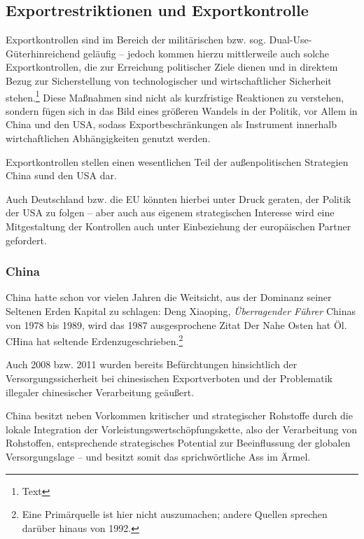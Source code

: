 \documentclass[12pt,a4paper,oneside]{book} %
\begin{document}
\subsection{Exportrestriktionen und Exportkontrolle}



Exportkontrollen sind im Bereich der militärischen bzw. sog. \glqq Dual-Use-Güter\grqq hinreichend geläufig -- jedoch kommen hierzu mittlerweile auch solche Exportkontrollen, die zur Erreichung politischer Ziele dienen und in direktem Bezug zur Sicherstellung von technologischer und wirtschaftlicher Sicherheit stehen.\footnote{Text} Diese Maßnahmen sind nicht als kurzfristige Reaktionen zu verstehen, sondern fügen sich in das Bild eines größeren Wandels in der Politik, vor Allem in China und den USA, sodass Exportbeschränkungen als Instrument innerhalb wirtchaftlichen Abhängigkeiten genutzt werden.

Exportkontrollen stellen einen wesentlichen Teil der außenpolitischen Strategien China sund den USA dar.

Auch Deutschland bzw. die EU könnten hierbei unter Druck geraten, der Politik der USA zu folgen -- aber auch aus eigenem strategischen Interesse wird eine Mitgestaltung der Kontrollen auch unter Einbeziehung der europäischen Partner gefordert.\autocite{Medunic, FiliP. Deutschland muss Exportkontrollen strategischer gestalten, DGAp Memo Nr. 15, Juli 2024, S.1.}


\subsubsection{China}

China hatte schon vor vielen Jahren die Weitsicht, aus der Dominanz seiner Seltenen Erden Kapital zu schlagen: Deng Xiaoping, \textit{Überragender Führer} Chinas von 1978 bis 1989, wird das 1987 ausgesprochene Zitat \glqq Der Nahe Osten hat Öl. CHina hat seltende Erden\grqq zugeschrieben.\footnote{Eine Primärquelle ist hier nicht auszumachen; andere Quellen sprechen darüber hinaus von 1992.}

Auch 2008 bzw. 2011 wurden bereits Befürchtungen hinsichtlich der Versorgungssicherheit bei chinesischen Exportverboten\autocite{Top Commodty News 31, S. 1} und der Problematik illegaler chinesischer Verarbeitung\autocite{Top Commodty News 36} geäußert.

China besitzt neben Vorkommen kritischer und strategischer Rohstoffe durch die lokale Integration der Vorleistungswertschöpfungskette, also der Verarbeitung von Rohstoffen, entsprechende strategisches Potential zur Beeinflussung der globalen Versorgungslage -- und besitzt somit das sprichwörtliche \glqq Ass im Ärmel\grqq.\autocite{Rachman, Gideon: }
\end{document}
